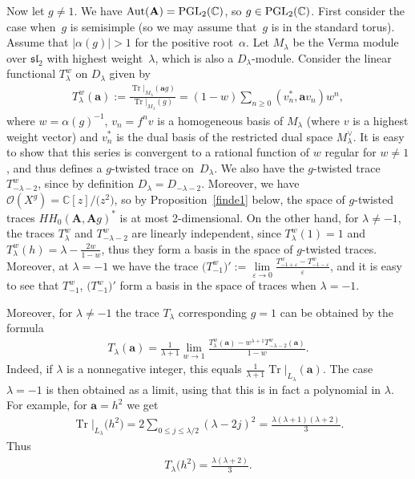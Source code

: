 \documentclass[pdftex]{sigma}
\numberwithin{equation}{section}
\begin{document}
\begin{Example}
Now let $g\ne 1$. We have $\operatorname{Aut}({\mathbf A})={\rm PGL}_2({\mathbb C})$, so $g\in {\rm PGL}_2({\mathbb C})$. First consider the case when~$g$ is semisimple (so we may assume that~$g$ is in the standard torus).
Assume that $|\alpha(g)|>1$ for the positive root~$\alpha$. Let $M_\lambda$ be the Verma module
over $\mathfrak{sl}_2$ with highest weight~$\lambda$, which is also a $D_\lambda$-module. Consider the linear functional $T_\lambda^w$ on $D_\lambda$ given by
\begin{gather*}
T_\lambda^w({\mathbf a}):=\frac{\operatorname{Tr}|_{M_\lambda}({\mathbf a} g)}{\operatorname{Tr}|_{M_\lambda}(g)}=
(1-w)\sum_{n\ge 0}(v_n^*,{\mathbf a} v_n)w^n,
\end{gather*}
where $w=\alpha(g)^{-1}$, $v_n=f^nv$ is a homogeneous basis of $M_\lambda$ (where $v$ is a highest weight vector) and $v_n^*$ is the dual basis of the restricted dual space $M_\lambda^\vee$. It is easy to show that this series is convergent to a rational function of $w$ regular for $w\ne 1$, and thus defines a $g$-twisted trace on~$D_\lambda$. We also have the $g$-twisted trace $T_{-\lambda-2}^w$, since by definition
$D_\lambda=D_{-\lambda-2}$. Moreover, we have $\mathcal{O}(X^g)={\mathbb C}[z]/\big(z^2\big)$, so by Proposition~\ref{finde1} below, the space of $g$-twisted traces $HH_0({\mathbf A},{\mathbf A}g)^*$ is at most 2-dimensional. On the other hand, for $\lambda\ne -1$, the traces $T_\lambda^w$ and $T_{-\lambda-2}^w$ are linearly independent, since $T_\lambda^w(1)=1$ and $T_\lambda^w(h)=\lambda-\frac{2w}{1-w}$, thus they form a basis in the space of $g$-twisted traces. Moreover, at $\lambda=-1$ we have the trace
$\big(T_{-1}^w\big)':=\lim\limits_{\varepsilon\to 0}\frac{T_{-1+\varepsilon}^w-T_{-1-\varepsilon}^w}{\varepsilon}$, and
it is easy to see that $T_{-1}^w$, $\big(T_{-1}^w\big)'$ form a basis in the space of traces
when $\lambda=-1$.

Moreover, for $\lambda\ne -1$ the trace $T_\lambda$ corresponding $g=1$ can be obtained by the formula
\begin{gather*}
T_\lambda({\mathbf a})=\frac{1}{\lambda+1}\lim_{w\to 1}\frac{T_\lambda^w({\mathbf a})-w^{\lambda+1}T_{-\lambda-2}^w({\mathbf a})}{1-w}.
\end{gather*}
Indeed, if $\lambda$ is a nonnegative integer, this equals $\frac{1}{\lambda+1}\operatorname{Tr}|_{L_\lambda}({\mathbf a})$. The case $\lambda=-1$ is then obtained as a limit, using that this is in fact a polynomial in $\lambda$. For example, for ${\mathbf a}=h^2$ we get
\begin{gather*}
\operatorname{Tr}|_{L_\lambda}\big(h^2\big)=2\sum_{0\le j\le \lambda/2}(\lambda-2j)^2=\frac{\lambda(\lambda+1)(\lambda+2)}{3}.
\end{gather*}
Thus
\begin{gather*}
T_\lambda\big(h^2\big)=\frac{\lambda(\lambda+2)}{3}.
\end{gather*}


\end{Example}
\end{document}
